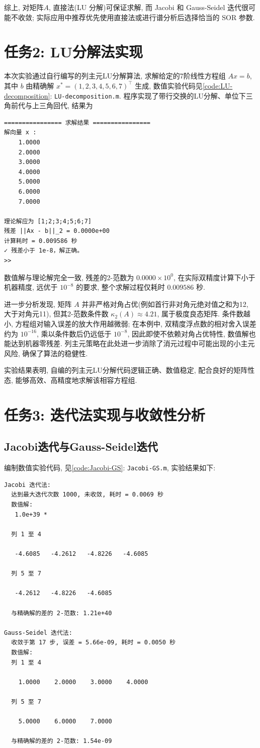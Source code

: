 \documentclass[12pt,a4paper]{ctexart}
\begin{document}
综上, 对矩阵$A$, 直接法(LU 分解)可保证求解, 而 Jacobi 和 Gauss-Seidel 迭代很可能不收敛; 实际应用中推荐优先使用直接法或进行谱分析后选择恰当的 SOR 参数. 
\section{任务2: LU分解法实现}
本次实验通过自行编写的列主元LU分解算法, 求解给定的7阶线性方程组 $Ax = b$, 其中 $b$ 由精确解 $x^* = (1,2,3,4,5,6,7)^\top$ 生成, 数值实验代码见\ref{code:LU-decomposition}: \texttt{LU-decomposition.m}. 程序实现了带行交换的LU分解、单位下三角前代与上三角回代, 结果为
\begin{lstlisting}
================ 求解结果 ================
解向量 x :
    1.0000
    2.0000
    3.0000
    4.0000
    5.0000
    6.0000
    7.0000

理论解应为 [1;2;3;4;5;6;7]
残差 ||Ax - b||_2 = 0.0000e+00
计算耗时 = 0.009586 秒
✓ 残差小于 1e-8，解正确。
>> 
\end{lstlisting}

数值解与理论解完全一致, 残差的2-范数为 $0.0000 \times 10^{0}$, 在实际双精度计算下小于机器精度, 远优于 $10^{-8}$ 的要求, 整个求解过程仅耗时 $0.009586$ 秒. 

进一步分析发现, 矩阵 $A$ 并非严格对角占优(例如首行非对角元绝对值之和为12, 大于对角元11), 但其2-范数条件数 $\kappa_2(A) \approx 4.21$, 属于极度良态矩阵. 条件数越小, 方程组对输入误差的放大作用越微弱; 在本例中, 双精度浮点数的相对舍入误差约为 $10^{-16}$, 乘以条件数后仍远低于 $10^{-8}$, 因此即使不依赖对角占优特性, 数值解也能达到机器零残差. 列主元策略在此处进一步消除了消元过程中可能出现的小主元风险, 确保了算法的稳健性. 

实验结果表明, 自编的列主元LU分解代码逻辑正确、数值稳定, 配合良好的矩阵性态, 能够高效、高精度地求解该相容方程组.

\section{任务3: 迭代法实现与收敛性分析}
\subsection{Jacobi迭代与Gauss-Seidel迭代}
编制数值实验代码, 见\ref{code:Jacobi-GS}: \texttt{Jacobi-GS.m}, 实验结果如下:
\begin{lstlisting}
Jacobi 迭代法:
  达到最大迭代次数 1000, 未收敛, 耗时 = 0.0069 秒
  数值解: 
   1.0e+39 *

  列 1 至 4

   -4.6085   -4.2612   -4.8226   -4.6085

  列 5 至 7

   -4.2612   -4.8226   -4.6085

  与精确解的差的 2-范数: 1.21e+40

Gauss-Seidel 迭代法:
  收敛于第 17 步, 误差 = 5.66e-09, 耗时 = 0.0050 秒
  数值解: 
  列 1 至 4

    1.0000    2.0000    3.0000    4.0000

  列 5 至 7

    5.0000    6.0000    7.0000

  与精确解的差的 2-范数: 1.54e-09
\end{lstlisting}
\end{document}
